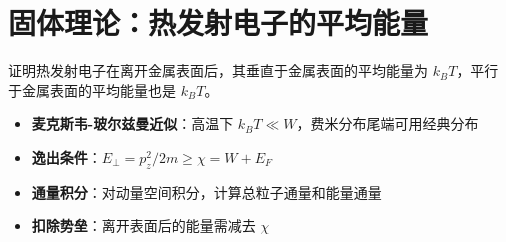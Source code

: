 \section{固体理论：热发射电子的平均能量}
\label{sec:thermionic-energy}

\begin{modelbox}[题目：热发射电子垂直与平行表面方向的平均能量]
证明热发射电子在离开金属表面后，其垂直于金属表面的平均能量为 $k_BT$，平行于金属表面的平均能量也是 $k_BT$。
\end{modelbox}

\begin{tipbox}[考点快速分析]
\begin{itemize}
    \item \textbf{麦克斯韦-玻尔兹曼近似}：高温下 $k_BT\ll W$，费米分布尾端可用经典分布
    \item \textbf{逸出条件}：$E_\perp=p_z^2/2m\ge\chi=W+E_F$
    \item \textbf{通量积分}：对动量空间积分，计算总粒子通量和能量通量
    \item \textbf{扣除势垒}：离开表面后的能量需减去 $\chi$
\end{itemize}
\end{tipbox}

